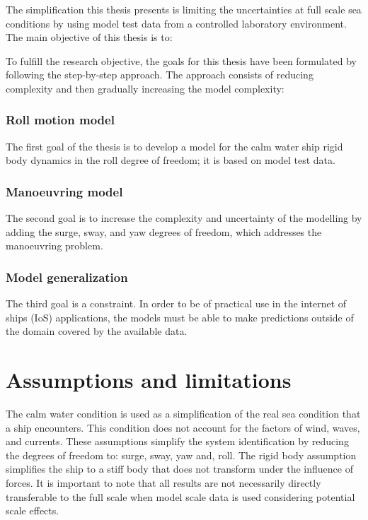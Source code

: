\noindent The simplification this thesis presents is limiting the uncertainties at full scale sea conditions by using model test data from a controlled laboratory environment. The main objective of this thesis is to:
\begin{quote} 
\expandafter\MakeUppercase \objective
\end{quote}

\noindent 
To fulfill the research objective, the goals for this thesis have been formulated by following the step-by-step approach. The approach consists of reducing complexity and then gradually increasing the model complexity:

\subsubsection*{\normalfont \color{black} \textbf{Roll motion model}}
The first goal of the thesis is to develop a model for the calm water ship rigid body dynamics in the roll degree of freedom; it is based on model test data.

\subsubsection*{\normalfont \color{black} \textbf{Manoeuvring model}}
The second goal is to increase the complexity and uncertainty of the modelling by adding the surge, sway, and yaw degrees of freedom, which addresses the manoeuvring problem.

\subsubsection*{\normalfont \color{black} \textbf{Model generalization}}
The third goal is a constraint. In order to be of practical use in the internet of ships (IoS) applications, the models must be able to make predictions outside of the domain covered by the available data.

\section{Assumptions and limitations}
The calm water condition is used as a simplification of the real sea condition that a ship encounters. This condition does not account for the factors of wind, waves, and currents. These assumptions simplify the system identification by reducing the degrees of freedom to: surge, sway, yaw and, roll. 
The rigid body assumption simplifies the ship to a stiff body that does not transform under the influence of forces. 
It is important to note that all results are not necessarily directly transferable to the full scale when model scale data is used considering potential scale effects. 

